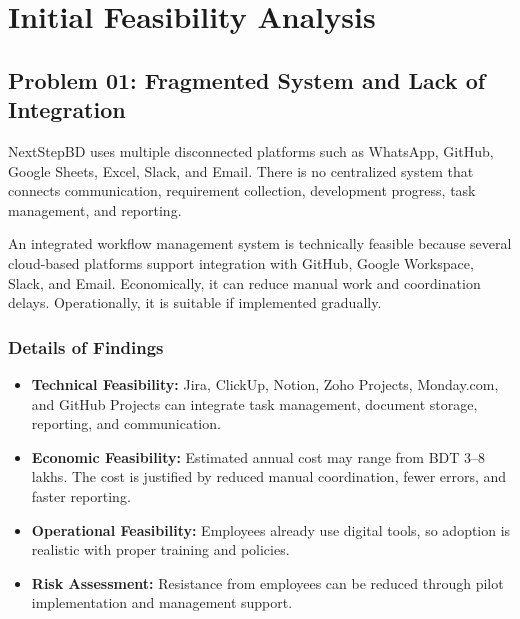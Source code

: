 \documentclass[12pt,a4paper]{report}
\begin{document}
\section{Initial Feasibility Analysis}

\subsection{Problem 01: Fragmented System and Lack of Integration}

\begin{problemBox}
NextStepBD uses multiple disconnected platforms such as WhatsApp, GitHub, Google Sheets, Excel, Slack, and Email. There is no centralized system that connects communication, requirement collection, development progress, task management, and reporting.
\end{problemBox}

\begin{summaryBox}
An integrated workflow management system is technically feasible because several cloud-based platforms support integration with GitHub, Google Workspace, Slack, and Email. Economically, it can reduce manual work and coordination delays. Operationally, it is suitable if implemented gradually.
\end{summaryBox}

\subsubsection{Details of Findings}

\begin{itemize}[leftmargin=*]
    \item \textbf{Technical Feasibility:} Jira, ClickUp, Notion, Zoho Projects, Monday.com, and GitHub Projects can integrate task management, document storage, reporting, and communication.
    \item \textbf{Economic Feasibility:} Estimated annual cost may range from BDT 3--8 lakhs. The cost is justified by reduced manual coordination, fewer errors, and faster reporting.
    \item \textbf{Operational Feasibility:} Employees already use digital tools, so adoption is realistic with proper training and policies.
    \item \textbf{Risk Assessment:} Resistance from employees can be reduced through pilot implementation and management support.
\end{itemize}
\end{document}
